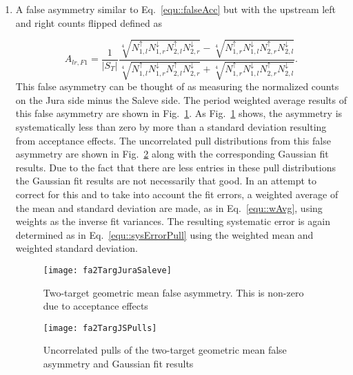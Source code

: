 \begin{enumerate}
  \label{tab::additionalFA}

\item A false asymmetry similar to Eq.~\ref{equ::falseAcc} but with the upstream
  left and right counts flipped defined as
  
  \begin{equation}
    \label{equ::additionalfalseAsym}
    A_{lr, F1} = \frac{1}{|S_T|}
    \frac{
      \sqrt[4]{
        N_{1,l}^\uparrow N_{1,r}^\downarrow N_{2,l}^\uparrow N_{2,r}^\downarrow
      }
      - \sqrt[4]{ N_{1,r}^\uparrow N_{1,l}^\downarrow
        N_{2,r}^\uparrow N_{2, l}^\downarrow }
      }{
      \sqrt[4]{
        N_{1,l}^\uparrow N_{1,r}^\downarrow
        N_{2,l}^\uparrow N_{2, r}^\downarrow
      } + \sqrt[4]{ N_{1,r}^\uparrow N_{1,l}^\downarrow
        N_{2,r}^\uparrow N_{2, l}^\downarrow
      }
    }.
  \end{equation}
  This false asymmetry can be thought of as measuring the normalized counts on
  the Jura side minus the Saleve side.  The period weighted average results of
  this false asymmetry are shown in Fig.~\ref{fig::fa2TargJuraSaleve}.  As
  Fig.~\ref{fig::fa2TargJuraSaleve} shows, the asymmetry is systematically less
  than zero by more than a standard deviation resulting from acceptance effects.
  The uncorrelated pull distributions from this false asymmetry are shown in
  Fig.~\ref{fig::fa2TargJSPulls} along with the corresponding Gaussian fit
  results.  Due to the fact that there are less entries in these pull
  distributions the Gaussian fit results are not necessarily that good.  In an
  attempt to correct for this and to take into account the fit errors, a
  weighted average of the mean and standard deviation are made, as in
  Eq.~\ref{equ::wAvg}, using weights as the inverse fit variances.  The
  resulting systematic error is again determined as in
  Eq.~\ref{equ::sysErrorPull} using the weighted mean and weighted standard
  deviation.

  \begin{figure}[h!t]
    \centering \texttt{[image: fa2TargJuraSaleve]}
    \caption{Two-target geometric mean false asymmetry.  This is non-zero due to
      acceptance effects}
    \label{fig::fa2TargJuraSaleve}
  \end{figure}
  
  \begin{figure}[h!t]
    \centering \texttt{[image: fa2TargJSPulls]}
    \caption{Uncorrelated pulls of the two-target geometric mean false asymmetry
      and Gaussian fit results}
    \label{fig::fa2TargJSPulls}
  \end{figure}


\end{enumerate}
